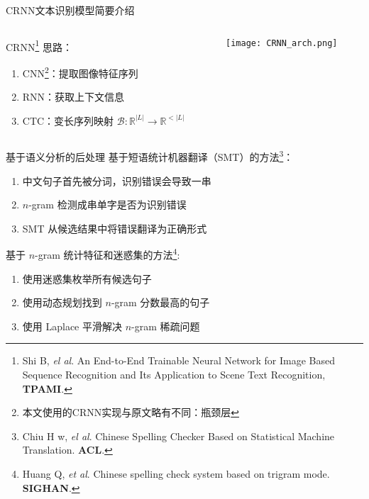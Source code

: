 \begin{frame}[c]{CRNN文本识别模型}{简要介绍}
\begin{columns}[t]
	\begin{column}[T]{5cm}
		CRNN\footnote{Shi B, \textit{el al}. An End-­to-­End Trainable Neural Network for Image Based Sequence Recognition and Its Application to Scene Text Recognition, \textbf{TPAMI}.} 思路：
		\begin{enumerate}
			\item CNN\footnote{本文使用的CRNN实现与原文略有不同：瓶颈层}：提取图像特征序列
			\item RNN：获取上下文信息
			\item CTC：变长序列映射 $\mathcal{B}: \mathbb{R}^{|L|} \rightarrow \mathbb{R}^{<|L|}$
		\end{enumerate}
	\end{column}
	\begin{column}[T]{6cm}
		\vspace{-2.5em}
		\texttt{[image: CRNN\_arch.png]}
	\end{column}
\end{columns}
\end{frame}

\begin{frame}[c]{基于语义分析的后处理}
	基于短语统计机器翻译（SMT）的方法\footnote{Chiu H w, \textit{el al}. Chinese Spelling Checker Based on Statistical
		Machine Translation. \textbf{ACL}.}：
	\begin{enumerate}
		\item 中文句子首先被分词，识别错误会导致一串
		\item $n$-gram 检测成串单字是否为识别错误
		\item SMT 从候选结果中将错误翻译为正确形式
	\end{enumerate}

	\vspace{1.0em}
	
	基于 $n$-­gram 统计特征和迷惑集的方法\footnote{Huang Q, \textit{et al}. Chinese spelling check system based on tri­gram mode. \textbf{SIGHAN}.}:
	\begin{enumerate}
		\item 使用迷惑集枚举所有候选句子
		\item 使用动态规划找到 $n$-gram 分数最高的句子
		\item 使用 Laplace 平滑解决 $n$-gram 稀疏问题
	\end{enumerate}
\end{frame}

